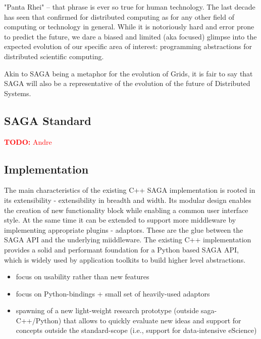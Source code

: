 \documentclass{article}
\newcommand{\B}[1]{\textbf{#1}}
\newcommand{\todo}[1]{{\textcolor{red}{\B{TODO:} #1 }}}
\newcommand{\hknote}[1]{{\textcolor{red}{  \B{Hartmut: } #1 }}}
\newcommand{\hknote}[1]{}
\begin{document}
  "Panta Rhei" -- that phrase is ever so true for human technology.
  The last decade has seen that confirmed for distributed computing as
  for any other field of computing or technology in general.  While it
  is notoriously hard and error prone to predict the future, we dare a
  biased and limited (aka focused) glimpse into the expected evolution
  of our specific area of interest: programming abstractions for
  distributed scientific computing. 

  Akin to SAGA being a metaphor for the evolution of Grids, it is fair
  to say that SAGA will also be a representative of the evolution of
  the future of Distributed Systems.

\subsection{SAGA Standard}

\todo{Andre}

\subsection{Implementation}

The main characteristics of the existing C++ SAGA implementation is rooted in its
extensibility - extensibility in breadth and width. Its modular design enables the
creation of new functionality block while enabling a common user interface style.
At the same time it can be extended to support more middleware by implementing
appropriate plugins - adaptors. These are the glue between the SAGA API and 
the underlying miiddleware. The existing C++ implementation provides a solid 
and performant foundation for a Python based SAGA API, which is widely used 
by application toolkits to build higher level abstractions.

\begin{itemize}
\item focus on usability rather than new features
\item focus on Python-bindings + small set of heavily-used adaptors
\item spawning of a new light-weight research prototype (outside saga-C++/Python) that allows to quickly evaluate new ideas and support for concepts outside the standard-scope (i.e., support for data-intensive eScience)
\end{itemize}

\end{document}
